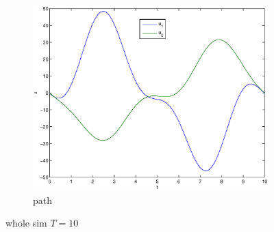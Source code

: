 \begin{figure}
\begin{subfigure}[b]{\textwidth}
\centering
\includegraphics[height=0.3\textheight]{img/final_1_15_10_u.eps}
\caption{path}
\end{subfigure}
\caption{whole sim $T=10$}
\end{figure}

